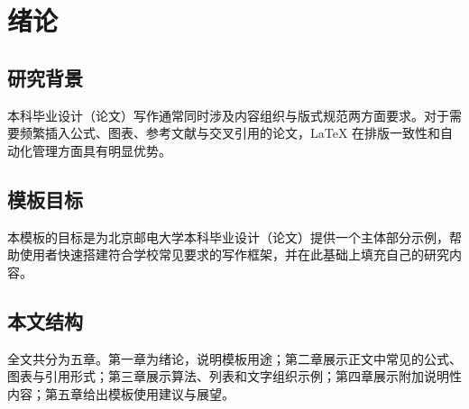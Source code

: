 \chapter{绪论}

\section{研究背景}

本科毕业设计（论文）写作通常同时涉及内容组织与版式规范两方面要求。对于需要频繁插入公式、图表、参考文献与交叉引用的论文，\LaTeX{} 在排版一致性和自动化管理方面具有明显优势\cite{Lamport1994Latex,Knuth1986TeXbook}。

\section{模板目标}

本模板的目标是为北京邮电大学本科毕业设计（论文）提供一个主体部分示例，帮助使用者快速搭建符合学校常见要求的写作框架，并在此基础上填充自己的研究内容。

\section{本文结构}

全文共分为五章。第一章为绪论，说明模板用途；第二章展示正文中常见的公式、图表与引用形式；第三章展示算法、列表和文字组织示例；第四章展示附加说明性内容；第五章给出模板使用建议与展望。
